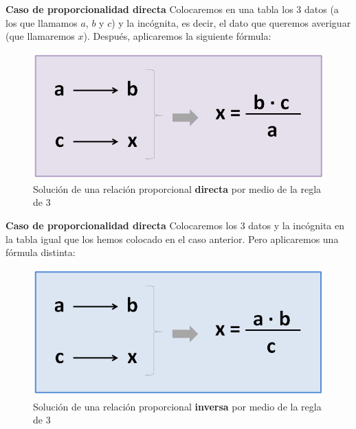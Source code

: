 \begin{tcolorbox}[
        colback=colorrds!5!white,
        colframe=colorrds!35!white,
        coltitle=black,
        fonttitle=\bfseries,
        center title,
        title=Regla de 3
    ]
    \textbf{Caso de proporcionalidad directa}
    Colocaremos en una tabla los 3 datos (a los que llamamos $a$, $b$ y $c$) y la incógnita, es decir, el dato que queremos averiguar (que llamaremos $x$). Después, aplicaremos la siguiente fórmula:
    \begin{figure}[H]
        \centering
        \includegraphics[width=.9\linewidth]{../images/formula-regla-de-3-img1}
        \caption{Solución de una relación proporcional \textbf{directa} por medio de la regla de 3}
        \label{fig:}
    \end{figure}

    \textbf{Caso de proporcionalidad directa}
    Colocaremos los 3 datos y la incógnita en la tabla igual que los hemos colocado en el caso anterior. Pero aplicaremos una fórmula distinta:
    \begin{figure}[H]
        \centering
        \includegraphics[width=.9\linewidth]{../images/formula-regla-de-3-img3}
        \caption{Solución de una relación proporcional \textbf{inversa} por medio de la regla de 3}
        \label{fig:}
    \end{figure}
\end{tcolorbox}
